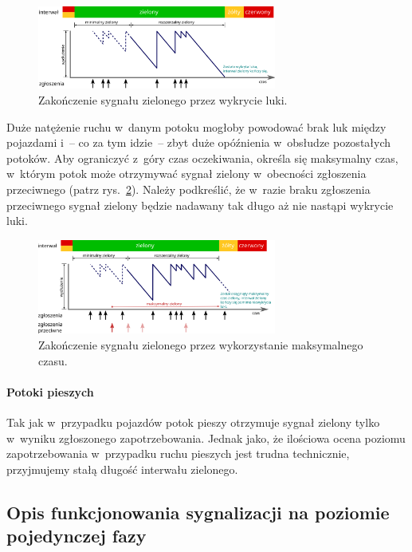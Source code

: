 \documentclass{pracamgr}
\newcommand{\imgr}[1]{rys.~\ref{#1}}
\theoremstyle{plain}
\begin{document}
\begin{figure}[h] \centering
  \includegraphics[width=0.7\textwidth]{img/signals-gap-out}
  \caption{Zakończenie sygnału zielonego przez wykrycie luki.}
\label{img:gap-out}
\end{figure}

Duże natężenie ruchu w~danym potoku mogłoby powodować brak luk między
pojazdami i~-- co za tym idzie~-- zbyt duże opóźnienia w~obsłudze
pozostałych potoków. Aby ograniczyć z~góry czas oczekiwania, określa
się maksymalny czas, w~którym potok może otrzymywać sygnał zielony
w~obecności zgłoszenia przeciwnego (patrz \imgr{img:max-out}). Należy
podkreślić, że w~razie braku zgłoszenia przeciwnego sygnał zielony
będzie nadawany tak długo aż nie nastąpi wykrycie luki.
\begin{figure}[h] \centering
  \includegraphics[width=0.7\textwidth]{img/signals-max-out}
  \caption{Zakończenie sygnału zielonego przez wykorzystanie
maksymalnego czasu.}
\label{img:max-out}
\end{figure}

\paragraph{Potoki pieszych} Tak jak w~przypadku pojazdów potok pieszy
otrzymuje sygnał zielony tylko w~wyniku zgłoszonego
zapotrzebowania. Jednak jako, że ilościowa ocena poziomu
zapotrzebowania w~przypadku ruchu pieszych jest trudna technicznie,
przyjmujemy stałą długość interwału zielonego.

\subsection{Opis funkcjonowania sygnalizacji na poziomie pojedynczej
fazy}
\end{document}
